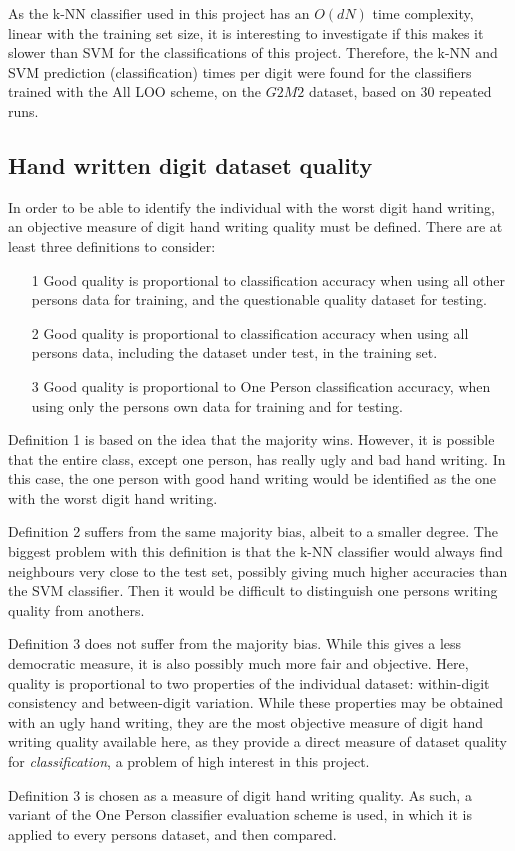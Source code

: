 As the k-NN classifier used in this project
has an \(O\left(d N\right)\) time complexity,
linear with the training set size,
it is interesting to investigate if this makes it slower than SVM
for the classifications of this project.
Therefore, the k-NN and SVM prediction (classification)
times per digit were found for the classifiers
trained with the All LOO scheme, on the \(G2M2\) dataset,
based on 30 repeated runs.

\subsection{Hand written digit dataset quality}
In order to be able to identify the individual with the worst
digit hand writing, an objective measure
of digit hand writing quality must be defined.
There are at least three definitions to consider:
\begin{enumerate}
\item[1] Good quality is proportional to classification accuracy when using all other
persons data for training, and the questionable quality dataset for testing.
\item[2] Good quality is proportional to classification accuracy when using all
persons data, including the dataset under test, in the training set.
\item[3] Good quality is proportional to One Person classification accuracy,
when using only the persons own data for training and for testing.
\end{enumerate}

Definition 1 is based on the idea that the majority wins.
However, it is possible that the entire class, except one person,
has really ugly and bad hand writing. In this case,
the one person with good hand writing would be identified
as the one with the worst digit hand writing.

Definition 2 suffers from the same majority bias,
albeit to a smaller degree. The biggest problem with this
definition is that the k-NN classifier would always find neighbours very
close to the test set, possibly giving much higher
accuracies than the SVM classifier.
Then it would be difficult to distinguish one persons
writing quality from anothers.

Definition 3 does not suffer from the majority bias.
While this gives a less democratic measure,
it is also possibly much more fair and objective.
Here, quality is proportional to two properties of the individual dataset:
within-digit consistency and between-digit variation.
While these properties may be obtained with an ugly hand writing,
they are the most objective measure of digit hand writing quality
available here, as they provide
a direct measure of dataset quality for \textit{classification},
a problem of high interest in this project.

Definition 3 is chosen as a measure of digit hand writing quality.
As such, a variant of the One Person
classifier evaluation scheme is used,
in which it is applied to every persons dataset,
and then compared.